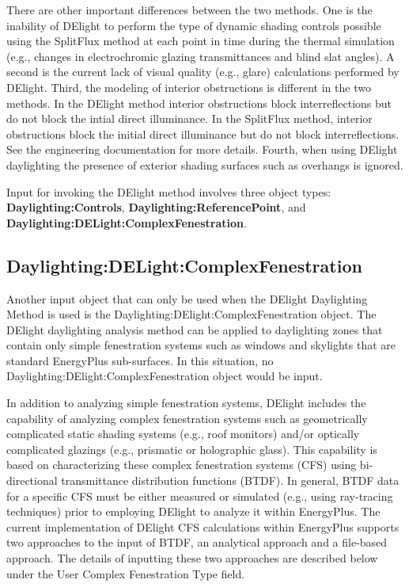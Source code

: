 There are other important differences between the two methods. One is the inability of DElight to perform the type of dynamic shading controls possible using the SplitFlux method at each point in time during the thermal simulation (e.g., changes in electrochromic glazing transmittances and blind slat angles).  A second is the current lack of visual quality (e.g., glare) calculations performed by DElight. Third, the modeling of interior obstructions is different in the two methods. In the DElight method interior obstructions block interreflections but do not block the intial direct illuminance. In the SplitFlux method, interior obstructions block the initial direct illuminance but do not block interreflections. See the engineering documentation for more details. Fourth, when using DElight daylighting the presence of exterior shading surfaces such as overhangs is ignored.

Input for invoking the DElight method involves three object types: \textbf{Daylighting:Controls}, \textbf{Daylighting:ReferencePoint}, and \textbf{Daylighting:DELight:ComplexFenestration}. 


\subsection{Daylighting:DELight:ComplexFenestration}\label{daylightingdelightcomplexfenestration}

Another input object that can only be used when the DElight Daylighting Method is used is  the Daylighting:DElight:ComplexFenestration object. The DElight daylighting analysis method can be applied to daylighting zones that contain only simple fenestration systems such as windows and skylights that are standard EnergyPlus sub-surfaces. In this situation, no Daylighting:DElight:ComplexFenestration object would be input.

In addition to analyzing simple fenestration systems, DElight includes the capability of analyzing complex fenestration systems such as geometrically complicated static shading systems (e.g., roof monitors) and/or optically complicated glazings (e.g., prismatic or holographic glass). This capability is based on characterizing these complex fenestration systems (CFS) using bi-directional transmittance distribution functions (BTDF). In general, BTDF data for a specific CFS must be either measured or simulated (e.g., using ray-tracing techniques) prior to employing DElight to analyze it within EnergyPlus. The current implementation of DElight CFS calculations within EnergyPlus supports two approaches to the input of BTDF, an analytical approach and a file-based approach. The details of inputting these two approaches are described below under the User Complex Fenestration Type field.

